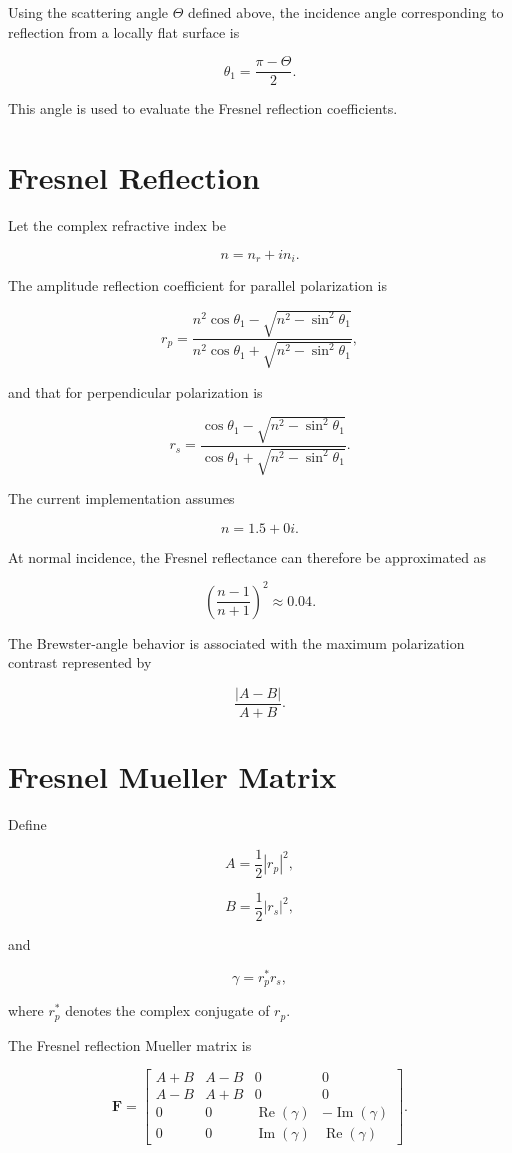 \documentclass[
  11pt,
  letterpaper,
]{scrreprt}
\begin{document}
Using the scattering angle \(\Theta\) defined above, the incidence angle
corresponding to reflection from a locally flat surface is

\[
\theta_1
=
\frac{\pi-\Theta}{2}.
\]

This angle is used to evaluate the Fresnel reflection coefficients.

\section{Fresnel Reflection}\label{fresnel-reflection}

Let the complex refractive index be

\[
n=n_r+i n_i.
\]

The amplitude reflection coefficient for parallel polarization is

\[
r_p
=
\frac{
n^2\cos\theta_1
-
\sqrt{n^2-\sin^2\theta_1}
}{
n^2\cos\theta_1
+
\sqrt{n^2-\sin^2\theta_1}
},
\]

and that for perpendicular polarization is

\[
r_s
=
\frac{
\cos\theta_1
-
\sqrt{n^2-\sin^2\theta_1}
}{
\cos\theta_1
+
\sqrt{n^2-\sin^2\theta_1}
}.
\]

The current implementation assumes

\[
n=1.5+0i.
\]

At normal incidence, the Fresnel reflectance can therefore be
approximated as

\[
\left(\frac{n-1}{n+1}\right)^2
\approx 0.04.
\]

The Brewster-angle behavior is associated with the maximum polarization
contrast represented by

\[
\frac{|A-B|}{A+B}.
\]

\section{Fresnel Mueller Matrix}\label{fresnel-mueller-matrix}

Define

\[
A=\frac{1}{2}|r_p|^2,
\]

\[
B=\frac{1}{2}|r_s|^2,
\]

and

\[
\gamma=r_p^*r_s,
\]

where \(r_p^*\) denotes the complex conjugate of \(r_p\).

The Fresnel reflection Mueller matrix is

\[
\mathbf{F}
=
\begin{bmatrix}
A+B & A-B & 0 & 0 \\
A-B & A+B & 0 & 0 \\
0 & 0 & \operatorname{Re}(\gamma) & -\operatorname{Im}(\gamma) \\
0 & 0 & \operatorname{Im}(\gamma) & \operatorname{Re}(\gamma)
\end{bmatrix}.
\]
\end{document}
